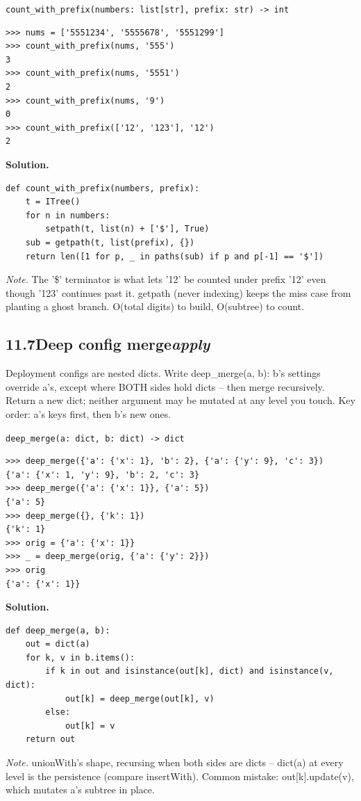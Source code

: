 \documentclass[10pt,letterpaper]{book}
\begin{document}
\noindent\texttt{count\_with\_prefix(numbers: list[str], prefix: str) -> int}
\begin{lstlisting}[style=ex]
>>> nums = ['5551234', '5555678', '5551299']
>>> count_with_prefix(nums, '555')
3
>>> count_with_prefix(nums, '5551')
2
>>> count_with_prefix(nums, '9')
0
>>> count_with_prefix(['12', '123'], '12')
2
\end{lstlisting}
\noindent\textbf{Solution.}
\begin{lstlisting}[style=code]
def count_with_prefix(numbers, prefix):
    t = ITree()
    for n in numbers:
        setpath(t, list(n) + ['$'], True)
    sub = getpath(t, list(prefix), {})
    return len([1 for p, _ in paths(sub) if p and p[-1] == '$'])
\end{lstlisting}
\noindent\textit{Note.} The '\$' terminator is what lets '12' be counted under prefix '12' even though '123' continues past it. getpath (never indexing) keeps the miss case from planting a ghost branch. O(total digits) to build, O(subtree) to count.

\subsection*{11.7\quad Deep config merge\hfill\textnormal{\textit{apply}}}
Deployment configs are nested dicts. Write deep\_merge(a, b): b's settings override a's, except where BOTH sides hold dicts -- then merge recursively. Return a new dict; neither argument may be mutated at any level you touch. Key order: a's keys first, then b's new ones.

\noindent\texttt{deep\_merge(a: dict, b: dict) -> dict}
\begin{lstlisting}[style=ex]
>>> deep_merge({'a': {'x': 1}, 'b': 2}, {'a': {'y': 9}, 'c': 3})
{'a': {'x': 1, 'y': 9}, 'b': 2, 'c': 3}
>>> deep_merge({'a': {'x': 1}}, {'a': 5})
{'a': 5}
>>> deep_merge({}, {'k': 1})
{'k': 1}
>>> orig = {'a': {'x': 1}}
>>> _ = deep_merge(orig, {'a': {'y': 2}})
>>> orig
{'a': {'x': 1}}
\end{lstlisting}
\noindent\textbf{Solution.}
\begin{lstlisting}[style=code]
def deep_merge(a, b):
    out = dict(a)
    for k, v in b.items():
        if k in out and isinstance(out[k], dict) and isinstance(v, dict):
            out[k] = deep_merge(out[k], v)
        else:
            out[k] = v
    return out
\end{lstlisting}
\noindent\textit{Note.} unionWith's shape, recursing when both sides are dicts -- dict(a) at every level is the persistence (compare insertWith). Common mistake: out[k].update(v), which mutates a's subtree in place.
\end{document}
